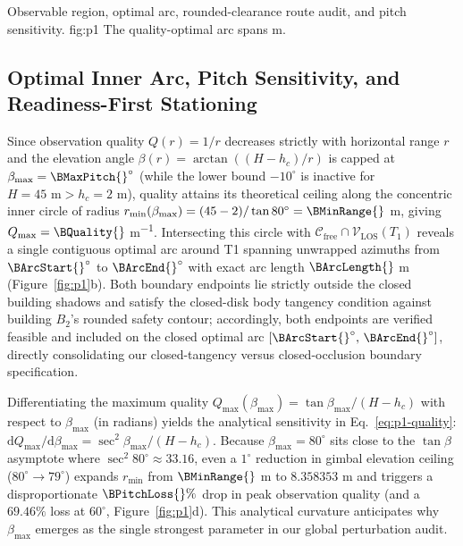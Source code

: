 {Observable region, optimal arc, rounded-clearance route audit, and pitch sensitivity.}
{fig:p1}
{The quality-optimal arc spans \BArcLength{} m.}

\subsection{Optimal Inner Arc, Pitch Sensitivity, and Readiness-First Stationing}
Since observation quality $Q(r)=1/r$ decreases strictly with horizontal range $r$ and the elevation angle $\beta(r)=\arctan((H-h_c)/r)$ is capped at $\beta_{\max}=\BMaxPitch{}^\circ$ (while the lower bound $-10^\circ$ is inactive for $H=45\text{ m}>h_c=2\text{ m}$), quality attains its theoretical ceiling along the concentric inner circle of radius $r_{\min}(\beta_{\max})=(45-2)/\tan 80^\circ=\BMinRange{}$ m, giving $Q_{\max}=\BQuality{}$ m\textsuperscript{$-1$}. Intersecting this circle with $\mathcal{C}_{\mathrm{free}}\cap\mathcal{V}_{\mathrm{LOS}}(T_1)$ reveals a single contiguous optimal arc around T1 spanning unwrapped azimuths from $\BArcStart{}^\circ$ to $\BArcEnd{}^\circ$ with exact arc length $\BArcLength{}$ m (Figure~\ref{fig:p1}b). Both boundary endpoints lie strictly outside the closed building shadows and satisfy the closed-disk body tangency condition against building $B_2$'s rounded safety contour; accordingly, both endpoints are verified feasible and included on the closed optimal arc $[\BArcStart{}^\circ,\,\BArcEnd{}^\circ]$, directly consolidating our closed-tangency versus closed-occlusion boundary specification.

Differentiating the maximum quality $Q_{\max}(\beta_{\max})=\tan\beta_{\max}/(H-h_c)$ with respect to $\beta_{\max}$ (in radians) yields the analytical sensitivity in Eq.~\eqref{eq:p1-quality}: $\mathrm{d}Q_{\max}/\mathrm{d}\beta_{\max}=\sec^2\beta_{\max}/(H-h_c)$. Because $\beta_{\max}=80^\circ$ sits close to the $\tan\beta$ asymptote where $\sec^2 80^\circ\approx 33.16$, even a $1^\circ$ reduction in gimbal elevation ceiling ($80^\circ\!\to\!79^\circ$) expands $r_{\min}$ from $\BMinRange{}$ m to $8.358353$ m and triggers a disproportionate $\BPitchLoss{}\%$ drop in peak observation quality (and a $69.46\%$ loss at $60^\circ$, Figure~\ref{fig:p1}d). This analytical curvature anticipates why $\beta_{\max}$ emerges as the single strongest parameter in our global perturbation audit.

